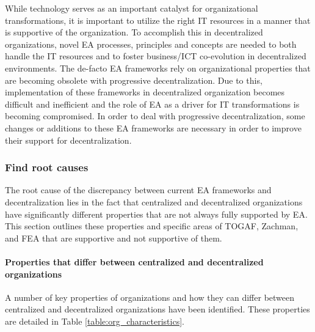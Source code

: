 While technology serves as an important catalyst for organizational transformations, it is important to utilize the right IT resources in a manner that is supportive of the organization. To accomplish this in decentralized organizations, novel EA processes, principles and concepts are needed to both handle the IT resources and to foster business/ICT co-evolution in decentralized environments. The de-facto EA frameworks rely on organizational properties that are becoming obsolete with progressive decentralization.  Due to this, implementation of these frameworks in decentralized organization becomes difficult and inefficient and the role of EA as a driver for IT transformations is becoming compromised. In order to deal with progressive decentralization, some changes or additions to these EA frameworks are necessary in order to improve their support for decentralization.




\subsubsection{Find root causes}

The root cause of the discrepancy between current EA frameworks and decentralization lies in the fact that centralized and decentralized organizations have significantly different properties that are not always fully supported by EA. This section outlines these properties and specific areas of TOGAF, Zachman, and FEA that are supportive and not supportive of them. 

\paragraph*{Properties that differ between centralized and decentralized organizations}

A number of key properties of organizations and how they can differ between centralized and decentralized organizations have been identified.  These properties are detailed in Table \ref{table:org_characteristics}.

